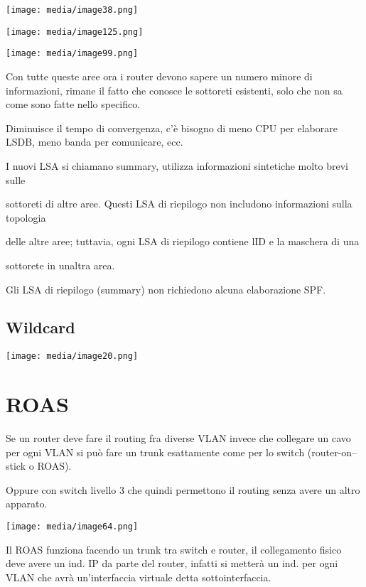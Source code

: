 \texttt{[image: media/image38.png]}

\texttt{[image: media/image125.png]}

\texttt{[image: media/image99.png]}

Con tutte queste aree ora i router devono sapere un numero minore di
informazioni, rimane il fatto che conosce le sottoreti esistenti, solo
che non sa come sono fatte nello specifico.

Diminuisce il tempo di convergenza, c'è bisogno di meno CPU per
elaborare LSDB, meno banda per comunicare, ecc.

I nuovi LSA si chiamano summary, utilizza informazioni sintetiche molto
brevi sulle

sottoreti di altre aree. Questi LSA di riepilogo non includono
informazioni sulla topologia

delle altre aree; tuttavia, ogni LSA di riepilogo contiene
l\textquotesingle ID e la maschera di una

sottorete in un\textquotesingle altra area.

Gli LSA di riepilogo (summary) non richiedono alcuna elaborazione SPF.

\subsection{Wildcard}\label{wildcard}

\texttt{[image: media/image20.png]}

\section{ROAS}\label{roas}

Se un router deve fare il routing fra diverse VLAN invece che collegare
un cavo per ogni VLAN si può fare un trunk esattamente come per lo
switch (router-on--stick o ROAS).

Oppure con switch livello 3 che quindi permettono il routing senza avere
un altro apparato.

\texttt{[image: media/image64.png]}

Il ROAS funziona facendo un trunk tra switch e router, il collegamento
fisico deve avere un ind. IP da parte del router, infatti si metterà un
ind. per ogni VLAN che avrà un'interfaccia virtuale detta
sottointerfaccia.

